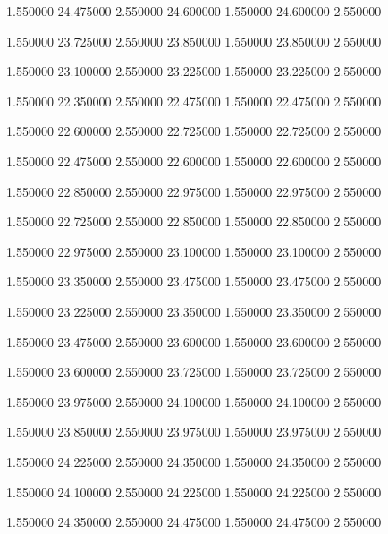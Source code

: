  {1.550000} {24.475000} {2.550000} {24.600000} {1.550000} {24.600000} {2.550000}

 {1.550000} {23.725000} {2.550000} {23.850000} {1.550000} {23.850000} {2.550000}

 {1.550000} {23.100000} {2.550000} {23.225000} {1.550000} {23.225000} {2.550000}

 {1.550000} {22.350000} {2.550000} {22.475000} {1.550000} {22.475000} {2.550000}

 {1.550000} {22.600000} {2.550000} {22.725000} {1.550000} {22.725000} {2.550000}

 {1.550000} {22.475000} {2.550000} {22.600000} {1.550000} {22.600000} {2.550000}

 {1.550000} {22.850000} {2.550000} {22.975000} {1.550000} {22.975000} {2.550000}

 {1.550000} {22.725000} {2.550000} {22.850000} {1.550000} {22.850000} {2.550000}

 {1.550000} {22.975000} {2.550000} {23.100000} {1.550000} {23.100000} {2.550000}

 {1.550000} {23.350000} {2.550000} {23.475000} {1.550000} {23.475000} {2.550000}

 {1.550000} {23.225000} {2.550000} {23.350000} {1.550000} {23.350000} {2.550000}

 {1.550000} {23.475000} {2.550000} {23.600000} {1.550000} {23.600000} {2.550000}

 {1.550000} {23.600000} {2.550000} {23.725000} {1.550000} {23.725000} {2.550000}

 {1.550000} {23.975000} {2.550000} {24.100000} {1.550000} {24.100000} {2.550000}

 {1.550000} {23.850000} {2.550000} {23.975000} {1.550000} {23.975000} {2.550000}

 {1.550000} {24.225000} {2.550000} {24.350000} {1.550000} {24.350000} {2.550000}

 {1.550000} {24.100000} {2.550000} {24.225000} {1.550000} {24.225000} {2.550000}

 {1.550000} {24.350000} {2.550000} {24.475000} {1.550000} {24.475000} {2.550000}

